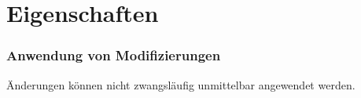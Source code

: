 \section{Eigenschaften}


\begin{frame}
	\frametitle{Anwendung von Modifizierungen}
	Änderungen können nicht zwangsläufig unmittelbar angewendet werden.\\
\end{frame}

